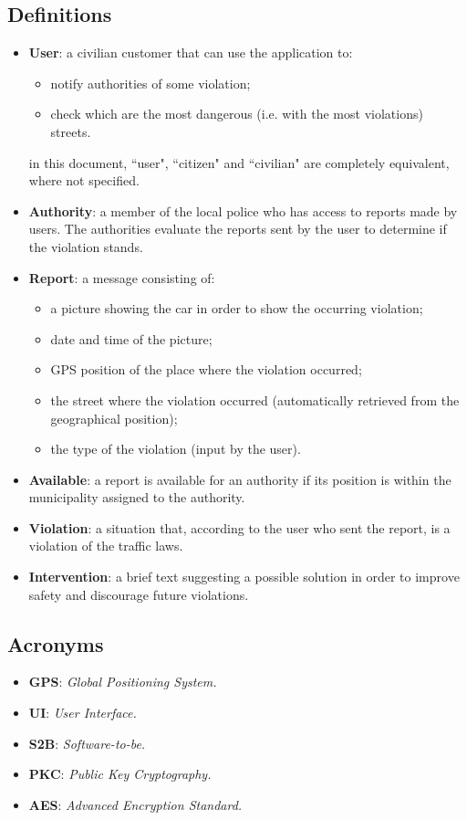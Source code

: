 \documentclass[12pt,a4paper]{report}
\begin{document}
		\subsection{Definitions}
		\begin{itemize}
		\item \textbf{User}: a civilian customer that can use the application to:
			\begin{itemize}
			\item notify authorities of some violation;
			\item check which are the most dangerous (i.e. with the most violations) streets.
			\end{itemize}
		in this document, ``user", ``citizen" and ``civilian" are completely equivalent, where not specified.
		\item \textbf{Authority}: a member of the local police who has access to reports made by users. The 					authorities evaluate the reports sent by the user to determine if the violation stands.
		\item \textbf{Report}: a message consisting of:
			\begin{itemize}
			\item a picture showing the car in order to show the occurring violation;
			\item date and time of the picture;
			\item GPS position of the place where the violation occurred;
			\item the street where the violation occurred (automatically retrieved from the geographical position);
			\item the type of the violation (input by the user).
			\end{itemize}
		\item \textbf{Available}: a report is available for an authority if its position is within the municipality assigned to the authority.
		\item \textbf{Violation}: a situation that, according to the user who sent the report, is a violation of the traffic laws.
		\item \textbf{Intervention}: a brief text suggesting a possible solution in order to improve safety and discourage future violations.
		\end{itemize}
		\subsection{Acronyms}
			\begin{itemize}
			\item \textbf{GPS}: \emph{Global Positioning System.}
			\item \textbf{UI}: \emph{User Interface.}		
			\item \textbf{S2B}: \emph{Software-to-be.}				
			\item \textbf{PKC}: \emph{Public Key Cryptography.}		
			\item \textbf{AES}: \emph{Advanced Encryption Standard.}		
			\end{itemize}
\end{document}
